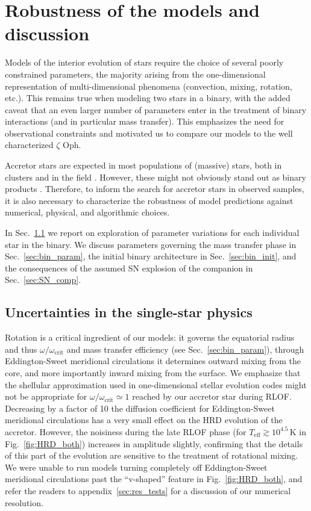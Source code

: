 \documentclass[twocolumn,twocolappendix,trackchanges]{aastex63}
\DeclareRobustCommand{\Figref}[1]{Fig.~\ref{#1}}
\DeclareRobustCommand{\Secref}[1]{Sec.~\ref{#1}}
\newcommand{\zoph}{$\zeta$ Oph}
\begin{document}
\section{Robustness of the models and discussion}
\label{sec:discussion}

Models of the interior evolution of stars require the choice of
several poorly constrained parameters, the majority arising from the
one-dimensional representation of multi-dimensional phenomena
(convection, mixing, rotation, etc.). This remains true when modeling
two stars in a binary, with the added caveat that an even larger
number of parameters enter in the treatment of binary interactions (and in
particular mass transfer). This emphasizes the need for
observational constraints and motivated us to compare our models to
the well characterized \zoph.

Accretor stars are expected in most populations of (massive)
stars, both in clusters \citep[e.g.,][]{chen:09, wang:20} and in the field
\citep[e.g.,][]{demink:11, demink:13}. However, these might not obviously stand
out as binary products \citep[e.g.,][]{renzo:19walk}. Therefore, to
inform the search for accretor stars in observed samples, it is
also necessary to characterize the robustness of model predictions
against numerical, physical, and algorithmic choices.

In \Secref{sec:single_star_uncertainties}
we report on exploration of parameter variations for each individual
star in the binary. We discuss parameters governing the mass transfer phase in
\Secref{sec:bin_param}, the initial binary architecture in
\Secref{sec:bin_init}, and the consequences of the assumed SN
explosion of the companion in \Secref{sec:SN_comp}.


\subsection{Uncertainties in the single-star physics}
\label{sec:single_star_uncertainties}

Rotation is a critical ingredient of our models: it governs the
equatorial radius and thus $\omega/\omega_\mathrm{crit}$
and mass transfer efficiency (see \Secref{sec:bin_param}), through
Eddington-Sweet meridional circulations it determines outward mixing
from the core, and more importantly inward mixing from the surface.
We emphasize that the shellular approximation used in one-dimensional
stellar evolution codes might not be appropriate for
$\omega/\omega_\mathrm{crit}\simeq 1$ reached by our accretor star
during RLOF. Decreasing by a factor of 10 the diffusion coefficient
for Eddington-Sweet meridional circulations has a very small effect on
the HRD evolution of the accretor. However, the noisiness during the
late RLOF phase (for $T_\mathrm{eff}\gtrsim10^{4.5}$\,K in
\Figref{fig:HRD_both}) increases in amplitude slightly, confirming
that the details of this part of the evolution are sensitive to the
treatment of rotational mixing. We were unable to run models turning
completely off Eddington-Sweet meridional circulations past the
``v-shaped'' feature in \Figref{fig:HRD_both}, and refer the readers
to appendix~\ref{sec:res_tests} for a discussion of our numerical resolution.
\end{document}
